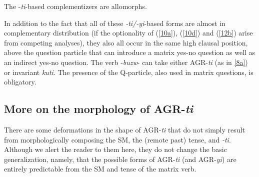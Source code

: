 \documentclass[output=paper,
modfonts
]{langscibook}
\begin{document}
\ea \label{18} \textup{The -\textit{ti}-based complementizers are allomorphs}. \z

In addition to the fact that all of these \textit{-ti/-yi}-based forms are almost in complementary distribution (if the optionality of (\ref{10a}),  (\ref{10d}) and (\ref{12b}) arise from competing analyses), they also all occur in the same high clausal position, above the question particle that can introduce a matrix yes-no question as well as an indirect yes-no question. The verb -\textit{buzw}- can take either AGR-\textit{ti} (as in \ref{8a}) or invariant \textit{kuti}. The presence of the Q-particle, also used in matrix questions, is obligatory.

\ea
{}



\z\z

\subsection{More on the morphology of AGR-\textit{ti}}

There are some deformations in the shape of AGR-\textit{ti} that do not simply result from morphologically composing the SM, the (remote past) tense, and \textit{-ti}. Although we alert the reader to them here, they do not change the basic generalization, namely, that the possible forms of AGR-\textit{ti} (and AGR-\textit{yi}) are entirely predictable from the SM and tense of the matrix verb. 
\end{document}
